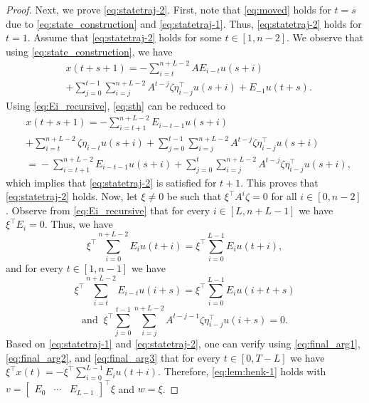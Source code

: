 \documentclass[10pt,a4paper]{amsart}
\begin{document}
\begin{proof}
Next, we prove \eqref{eq:statetraj-2}. First, note that \eqref{eq:moved} holds for $t=s$ due to \eqref{eq:state_construction} and \eqref{eq:statetraj-1}. Thus, \eqref{eq:statetraj-2} holds for $t=1$. Assume that \eqref{eq:statetraj-2} holds for some $t\in[1,n-2]$. We observe that using \eqref{eq:state_construction}, we have
\begin{equation}
\label{eq:sth}
\begin{split}
&x(t+s+1)=-\sum_{i=t}^{n+L-2}AE_{i-t} u(s+i) \\ &+\sum_{j=0}^{t-1}\sum_{i=j}^{n+L-2} A^{t-j}\zeta\eta_{i-j}^\top u(s+i)+E_{-1}u(t+s).
\end{split}
\end{equation}
Using \eqref{eq:Ei_recursive}, \eqref{eq:sth} can be reduced to
\begin{equation}
\begin{split}
&x(t+s+1)=-\sum_{i=t+1}^{n+L-2}E_{i-t-1} u(s+i) \\ &+\sum_{i=t}^{n+L-2}\zeta\eta_{i-t} u(s+i)+\sum_{j=0}^{t-1}\sum_{i=j}^{n+L-2} A^{t-j}\zeta\eta_{i-j}^\top u(s+i) \\
&=\!-\!\!\sum_{i=t+1}^{n+L-2}\!E_{i-t-1} u(s\!+\!i)+\sum_{j=0}^{t}\sum_{i=j}^{n+L-2}\! A^{t-j}\zeta\eta_{i-j}^\top u(s\!+\!i),
\end{split}
\end{equation}
which implies that \eqref{eq:statetraj-2} is satisfied for $t+1$. This proves that \eqref{eq:statetraj-2} holds. Now, let $\xi\neq 0$ be such that $\xi^\top A^i \zeta=0$ for all $i\in[0,n-2]$. Observe from \eqref{eq:Ei_recursive} that for every $i\in[L,n+L-1]$ we have $\xi^\top E_i=0$. Thus, we have
\begin{equation}
\label{eq:final_arg1}
\xi^\top\sum_{i=0}^{n+L-2} E_i u(t+i)=\xi^\top\sum_{i=0}^{L-1} E_i u(t+i),
\end{equation}
and for every $t\in[1,n-1]$ we have
\begin{equation}
\label{eq:final_arg2}
\xi^\top\sum_{i=t}^{n+L-2}E_{i-t} u(i+s)=\xi^\top\sum_{i=0}^{L-1} E_i u(i+t+s)
\end{equation}
\begin{equation}
\label{eq:final_arg3}
\text{and }\ \xi^\top\sum_{j=0}^{t-1}\sum_{i=j}^{n+L-2} \!\!A^{t-j-1}\zeta\eta_{i-j}^\top u(i+s)=0.
\end{equation}
Based on \eqref{eq:statetraj-1} and \eqref{eq:statetraj-2}, one can verify using \eqref{eq:final_arg1}, \eqref{eq:final_arg2}, and \eqref{eq:final_arg3} that for every $t\in[0,T-L]$ we have \mbox{$\xi^\top x(t)=-\xi^\top \sum_{i=0}^{L-1} E_i u(t+i)$}. Therefore, \eqref{eq:lem:henk-1} holds with $v=\begin{bmatrix}
E_0 & \cdots & E_{L-1}
\end{bmatrix}^\top \xi$ and $w=\xi$.
\end{proof}
\end{document}
